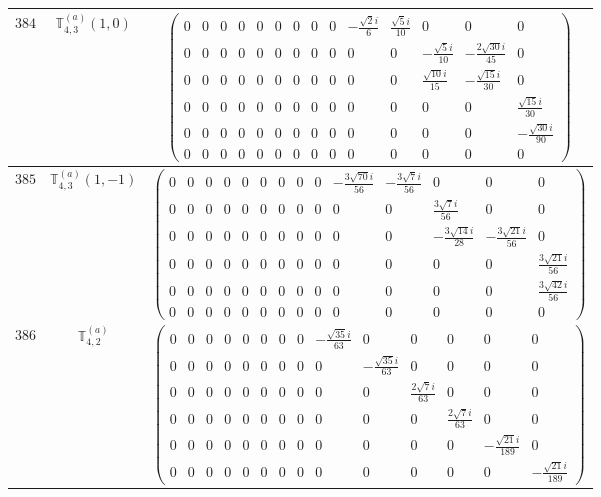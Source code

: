 \documentclass[fleqn,8pt,landscape]{jsarticle}
\begin{document}
\begin{center}
\begin{longtable}{ccc}
$ 384 $ & $ \mathbb{T}_{4,3}^{(a)}(1,0) $ & $ \begin{pmatrix} 0 & 0 & 0 & 0 & 0 & 0 & 0 & 0 & 0 & - \frac{\sqrt{2} i}{6} & \frac{\sqrt{5} i}{10} & 0 & 0 & 0 \\ 0 & 0 & 0 & 0 & 0 & 0 & 0 & 0 & 0 & 0 & 0 & - \frac{\sqrt{5} i}{10} & - \frac{2 \sqrt{30} i}{45} & 0 \\ 0 & 0 & 0 & 0 & 0 & 0 & 0 & 0 & 0 & 0 & 0 & \frac{\sqrt{10} i}{15} & - \frac{\sqrt{15} i}{30} & 0 \\ 0 & 0 & 0 & 0 & 0 & 0 & 0 & 0 & 0 & 0 & 0 & 0 & 0 & \frac{\sqrt{15} i}{30} \\ 0 & 0 & 0 & 0 & 0 & 0 & 0 & 0 & 0 & 0 & 0 & 0 & 0 & - \frac{\sqrt{30} i}{90} \\ 0 & 0 & 0 & 0 & 0 & 0 & 0 & 0 & 0 & 0 & 0 & 0 & 0 & 0 \end{pmatrix} $ \\ \hline
$ 385 $ & $ \mathbb{T}_{4,3}^{(a)}(1,-1) $ & $ \begin{pmatrix} 0 & 0 & 0 & 0 & 0 & 0 & 0 & 0 & 0 & - \frac{3 \sqrt{70} i}{56} & - \frac{3 \sqrt{7} i}{56} & 0 & 0 & 0 \\ 0 & 0 & 0 & 0 & 0 & 0 & 0 & 0 & 0 & 0 & 0 & \frac{3 \sqrt{7} i}{56} & 0 & 0 \\ 0 & 0 & 0 & 0 & 0 & 0 & 0 & 0 & 0 & 0 & 0 & - \frac{3 \sqrt{14} i}{28} & - \frac{3 \sqrt{21} i}{56} & 0 \\ 0 & 0 & 0 & 0 & 0 & 0 & 0 & 0 & 0 & 0 & 0 & 0 & 0 & \frac{3 \sqrt{21} i}{56} \\ 0 & 0 & 0 & 0 & 0 & 0 & 0 & 0 & 0 & 0 & 0 & 0 & 0 & \frac{3 \sqrt{42} i}{56} \\ 0 & 0 & 0 & 0 & 0 & 0 & 0 & 0 & 0 & 0 & 0 & 0 & 0 & 0 \end{pmatrix} $ \\ \hline
$ 386 $ & $ \mathbb{T}_{4,2}^{(a)} $ & $ \begin{pmatrix} 0 & 0 & 0 & 0 & 0 & 0 & 0 & 0 & - \frac{\sqrt{35} i}{63} & 0 & 0 & 0 & 0 & 0 \\ 0 & 0 & 0 & 0 & 0 & 0 & 0 & 0 & 0 & - \frac{\sqrt{35} i}{63} & 0 & 0 & 0 & 0 \\ 0 & 0 & 0 & 0 & 0 & 0 & 0 & 0 & 0 & 0 & \frac{2 \sqrt{7} i}{63} & 0 & 0 & 0 \\ 0 & 0 & 0 & 0 & 0 & 0 & 0 & 0 & 0 & 0 & 0 & \frac{2 \sqrt{7} i}{63} & 0 & 0 \\ 0 & 0 & 0 & 0 & 0 & 0 & 0 & 0 & 0 & 0 & 0 & 0 & - \frac{\sqrt{21} i}{189} & 0 \\ 0 & 0 & 0 & 0 & 0 & 0 & 0 & 0 & 0 & 0 & 0 & 0 & 0 & - \frac{\sqrt{21} i}{189} \end{pmatrix} $ \\ \hline

\end{longtable}
\end{center}
\end{document}
